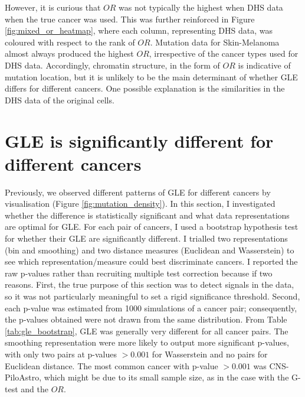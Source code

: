 However, it is curious that $OR$ was not typically the highest when DHS data when the true cancer was used. This was further reinforced in Figure \ref{fig:mixed_or_heatmap}, where each column, representing DHS data, was coloured with respect to the rank of $OR$. Mutation data for Skin-Melanoma almost always produced the highest $OR$, irrespective of the cancer types used for DHS data. Accordingly, chromatin structure, in the form of $OR$ is indicative of mutation location, but it is unlikely to be the main determinant of whether GLE differs for different cancers. One possible explanation is the similarities in the DHS data of the original cells.



\newpage
\section{GLE is significantly different for different cancers}\label{gle:bootstrap}
Previously, we observed different patterns of GLE for different cancers by visualisation (Figure \ref{fig:mutation_density}). In this section, I investigated whether the difference is statistically significant and what data representations are optimal for GLE. For each pair of cancers, I used a bootstrap hypothesis test for whether their GLE are significantly different. I trialled two representations (bin and smoothing) and two distance measures (Euclidean and Wasserstein) to see which representation/measure could best discriminate cancers. I reported the raw p-values rather than recruiting multiple test correction because if two reasons. First, the true purpose of this section was to detect signals in the data, so it was not particularly meaningful to set a rigid significance threshold. Second, each p-value was estimated from 1000 simulations of a cancer pair; consequently, the p-values obtained were not drawn from the same distribution. From Table \ref{tab:gle_bootstrap}, GLE was generally very different for all cancer pairs. The smoothing representation were more likely to output more significant p-values, with only two pairs at p-values $>0.001$ for Wasserstein and no pairs for Euclidean distance. The most common cancer with p-value $>0.001$ was CNS-PiloAstro, which might be due to its small sample size, as in the case with the G-test and the $OR$. 



